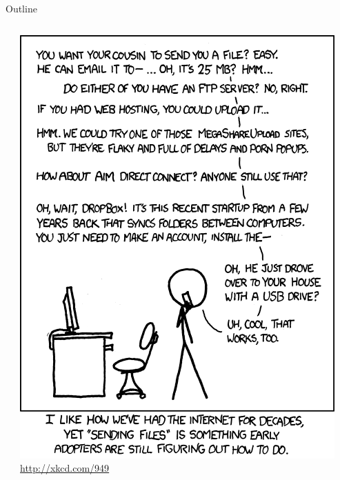 \begin{frame}{Outline}
	\begin{columns}
		\begin{column}{.50\textwidth}
			\tableofcontents
		\end{column}
		\begin{column}{.5\textwidth}
			\includegraphics[scale=0.3]{images/file_transfer}\newline
			{\tiny \url{http://xkcd.com/949}}
		\end{column}
	\end{columns}
\end{frame}
